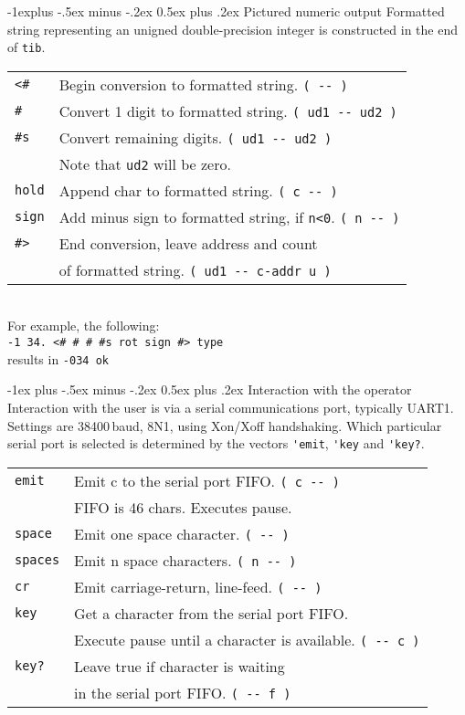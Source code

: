 \documentclass[10pt,landscape,a4paper]{article}
\makeatletter
\renewcommand{\section}{\@startsection{section}{1}{0mm}%
                                {-1ex plus -.5ex minus -.2ex}%
                                {0.5ex plus .2ex}%
                                {\normalfont\large\bfseries}}
\renewcommand{\subsection}{\@startsection{subsection}{2}{0mm}%
                                {-1explus -.5ex minus -.2ex}%
                                {0.5ex plus .2ex}%
                                {\normalfont\normalsize\bfseries}}
\newcommand{\compileonly}{\color{blue}}
\makeatother
\begin{document}
\begin{multicols}{3}
\subsection{Pictured numeric output}
Formatted string representing an unigned double-precision integer 
is constructed in the end of \verb!tib!.\\
\begin{tabular}{@{}ll@{}}
{\compileonly\verb!<#!}  & Begin conversion to formatted string. \verb!( -- )! \\
{\compileonly\verb!#!}  & Convert 1 digit to formatted string. \verb!( ud1 -- ud2 )! \\
{\compileonly\verb!#s!}  & Convert remaining digits. \verb!( ud1 -- ud2 )! \\
           & Note that \verb!ud2! will be zero. \\
{\compileonly\verb!hold!}  & Append char to formatted string. \verb!( c -- )! \\
\verb!sign!  & Add minus sign to formatted string, if \verb!n<0!. \verb!( n -- )! \\
{\compileonly\verb!#>!}  & End conversion, leave address and count \\
           & of formatted string. \verb!( ud1 -- c-addr u )! \\
\end{tabular}\\
For example, the following:\\
\verb!-1 34. <# # # #s rot sign #> type! \\
results in \verb!-034 ok!

\bigskip

\section{Interaction with the operator}
Interaction with the user is via a serial communications port, typically UART1.  
Settings are 38400\,baud, 8N1, using Xon/Xoff handshaking. 
Which particular serial port is selected is determined by the
vectors \verb!'emit!, \verb!'key! and \verb!'key?!.\\
\begin{tabular}{@{}ll@{}}
\verb!emit!  & Emit c to the serial port FIFO. \verb!( c -- )! \\
             & FIFO is 46 chars. Executes pause. \\
\verb!space!  & Emit one space character. \verb!( -- )! \\
\verb!spaces!  & Emit n space characters. \verb!( n -- )! \\
\verb!cr!  & Emit carriage-return, line-feed. \verb!( -- )! \\
\verb!key!  & Get a character from the serial port FIFO. \\
            & Execute pause until a character is available. \verb!( -- c )! \\
\verb!key?!  & Leave true if character is waiting \\
             & in the serial port FIFO.  \verb!( -- f )! \\
\end{tabular}


\end{multicols}
\end{document}
